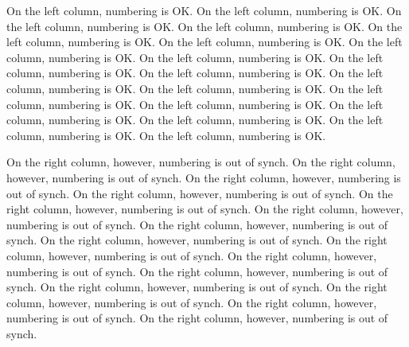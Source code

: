 \documentclass{book}
\begin{document}
\begin{pairs}
\begin{Leftside}
\resumenumbering
\pstart
On the left column, numbering is OK.
On the left column, numbering is OK.
On the left column, numbering is OK.
On the left column, numbering is OK.
On the left column, numbering is OK.
On the left column, numbering is OK.
On the left column, numbering is OK.
On the left column, numbering is OK.
On the left column, numbering is OK.
On the left column, numbering is OK.
On the left column, numbering is OK.
On the left column, numbering is OK.
On the left column, numbering is OK.
On the left column, numbering is OK.
On the left column, numbering is OK.
On the left column, numbering is OK.
On the left column, numbering is OK.
On the left column, numbering is OK.
\pend
\endnumbering
\end{Leftside}
\begin{Rightside}
\resumenumbering
\pstart
On the right column, however, numbering is out of synch.
On the right column, however, numbering is out of synch.
On the right column, however, numbering is out of synch.
On the right column, however, numbering is out of synch.
On the right column, however, numbering is out of synch.
On the right column, however, numbering is out of synch.
On the right column, however, numbering is out of synch.
On the right column, however, numbering is out of synch.
On the right column, however, numbering is out of synch.
On the right column, however, numbering is out of synch.
On the right column, however, numbering is out of synch.
On the right column, however, numbering is out of synch.
On the right column, however, numbering is out of synch.
On the right column, however, numbering is out of synch.
On the right column, however, numbering is out of synch.
\pend
\endnumbering
\end{Rightside}
\end{pairs}
\Columns
\end{document}
